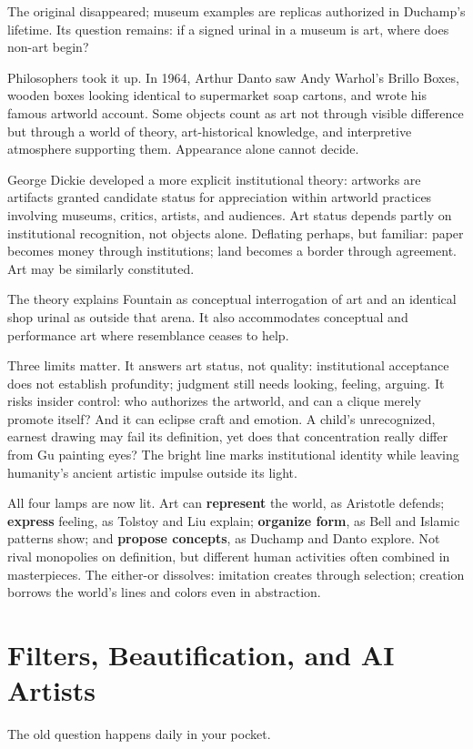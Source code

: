 The original disappeared; museum examples are replicas authorized in Duchamp's lifetime. Its question remains: if a signed urinal in a museum is art, where does non-art begin?

Philosophers took it up. In 1964, Arthur Danto saw Andy Warhol's Brillo Boxes, wooden boxes looking identical to supermarket soap cartons, and wrote his famous artworld account. Some objects count as art not through visible difference but through a world of theory, art-historical knowledge, and interpretive atmosphere supporting them. Appearance alone cannot decide.

George Dickie developed a more explicit institutional theory: artworks are artifacts granted candidate status for appreciation within artworld practices involving museums, critics, artists, and audiences. Art status depends partly on institutional recognition, not objects alone. Deflating perhaps, but familiar: paper becomes money through institutions; land becomes a border through agreement. Art may be similarly constituted.

The theory explains Fountain as conceptual interrogation of art and an identical shop urinal as outside that arena. It also accommodates conceptual and performance art where resemblance ceases to help.

Three limits matter. It answers art status, not quality: institutional acceptance does not establish profundity; judgment still needs looking, feeling, arguing. It risks insider control: who authorizes the artworld, and can a clique merely promote itself? And it can eclipse craft and emotion. A child's unrecognized, earnest drawing may fail its definition, yet does that concentration really differ from Gu painting eyes? The bright line marks institutional identity while leaving humanity's ancient artistic impulse outside its light.

All four lamps are now lit. Art can \textbf{represent} the world, as Aristotle defends; \textbf{express} feeling, as Tolstoy and Liu explain; \textbf{organize form}, as Bell and Islamic patterns show; and \textbf{propose concepts}, as Duchamp and Danto explore. Not rival monopolies on definition, but different human activities often combined in masterpieces. The either-or dissolves: imitation creates through selection; creation borrows the world's lines and colors even in abstraction.

\section{Filters, Beautification, and AI Artists}
The old question happens daily in your pocket.

